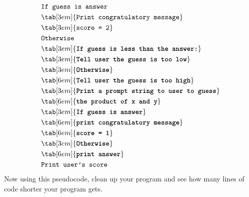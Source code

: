 \begin{align*}
& \texttt{If guess is answer}\\
& \tab[3em]{\texttt{Print congratulatory message}}\\
& \tab[3em]{\texttt{score = 2}}\\
& \texttt{Otherwise}\\
& \tab[3em]{\texttt{\textbf{If guess is less than the answer:}}}\\
& \tab[3em]{\texttt{\textbf{Tell user the guess is too low}}}\\
& \tab[3em]{\texttt{\textbf{Otherwise}}}\\
& \tab[6em]{\texttt{\textbf{Tell user the guess is too high}}}\\
& \tab[3em]{\texttt{\textbf{Print a prompt string to user to guess}}}\\
& \tab[6em]{\texttt{\textbf{the product of x and y}}}\\
& \tab[3em]{\texttt{\textbf{If guess is answer}}}\\
& \tab[6em]{\texttt{\textbf{print congratulatory message}}}\\
& \tab[6em]{\texttt{\textbf{score = 1}}}\\
& \tab[3em]{\texttt{\textbf{Otherwise}}}\\
& \tab[6em]{\texttt{\textbf{print answer}}}\\
& \texttt{Print user's score}\\
\end{align*}
Now using this pseudocode, clean up your program and see how many lines
of code shorter your program gets.

